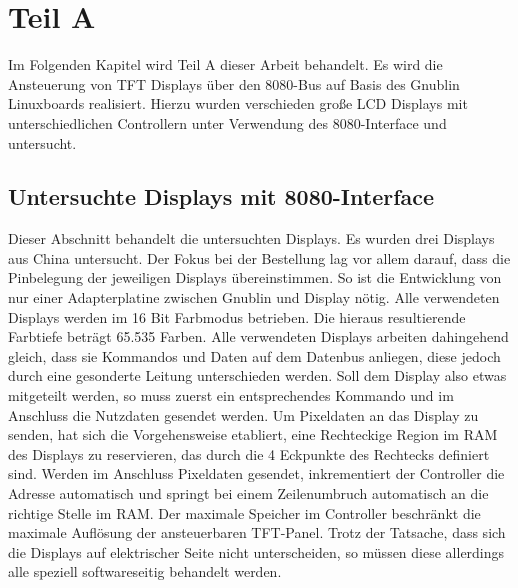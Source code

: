 \chapter{Teil A}
\label{cha:TeilA}
Im Folgenden Kapitel wird Teil A dieser Arbeit behandelt. Es wird die Ansteuerung von TFT Displays über den 8080-Bus auf Basis des Gnublin Linuxboards realisiert. Hierzu wurden verschieden große LCD Displays mit unterschiedlichen Controllern unter Verwendung des 8080-Interface und untersucht. 

\section{Untersuchte Displays mit 8080-Interface}
Dieser Abschnitt behandelt die untersuchten Displays. Es wurden drei Displays aus China untersucht. Der Fokus bei der Bestellung lag vor allem darauf, dass die Pinbelegung der jeweiligen Displays übereinstimmen. So ist die Entwicklung von nur einer Adapterplatine zwischen Gnublin und Display nötig. Alle verwendeten Displays werden im 16 Bit Farbmodus betrieben. Die hieraus resultierende Farbtiefe beträgt 65.535 Farben.\newline %
Alle verwendeten Displays arbeiten dahingehend gleich, dass sie Kommandos und Daten auf dem Datenbus anliegen, diese jedoch durch eine gesonderte Leitung unterschieden werden. Soll dem Display also etwas mitgeteilt werden, so muss zuerst ein entsprechendes Kommando und im Anschluss die Nutzdaten gesendet werden. Um Pixeldaten an das Display zu senden, hat sich die Vorgehensweise etabliert, eine Rechteckige Region im RAM des Displays zu reservieren, das durch die 4 Eckpunkte des Rechtecks definiert sind. Werden im Anschluss Pixeldaten gesendet, inkrementiert der Controller die Adresse automatisch und springt bei einem Zeilenumbruch automatisch an die richtige Stelle im RAM. Der maximale Speicher im Controller beschränkt die maximale Auflösung der ansteuerbaren TFT-Panel. Trotz der Tatsache, dass sich die Displays auf elektrischer Seite nicht unterscheiden, so müssen diese allerdings alle speziell softwareseitig behandelt werden. 


